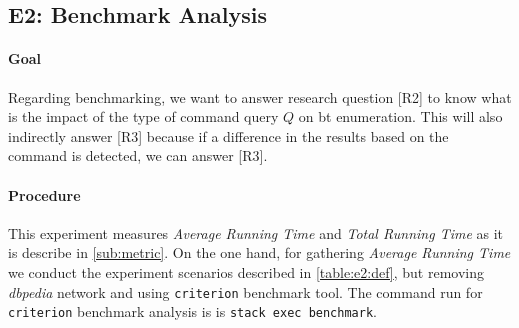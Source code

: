 \subsection{E2: Benchmark Analysis}\label{sub:sec:exp-2} 
\paragraph{Goal} Regarding benchmarking, we want to answer research question [R2] to know what is the impact of the type of command query $Q$ on \acrshort{bt} enumeration.
This will also indirectly answer [R3] because if a difference in the results based on the command is detected, we can answer [R3]. 

\paragraph{Procedure} This experiment measures \emph{Average Running Time} and \emph{Total Running Time} as it is describe in \autoref{sub:metric}. 
On the one hand, for gathering \emph{Average Running Time} we conduct the experiment scenarios described in \autoref{table:e2:def}, but removing \emph{\acrshort{dbpedia}} network and using \texttt{criterion} \cite{criterion} benchmark tool.
The command run for \texttt{criterion} benchmark analysis is is \texttt{stack exec benchmark}. 

